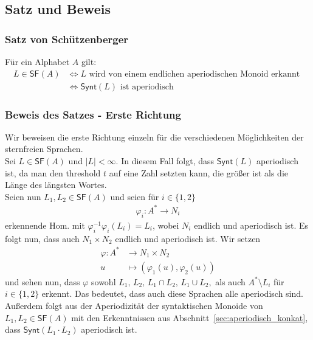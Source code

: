 \documentclass[12pt, german]{article}
\newcommand{\inv}{^{-1}}
\newcommand{\starfree}{\mathsf{SF}}
\newcommand{\synt}{\mathsf{Synt}}
\newcommand{\aast}{A^{\ast}}
\begin{document}
	\subsection{Satz und Beweis}
	\subsubsection{Satz von Schützenberger}
	Für ein Alphabet $A$ gilt: 
	\begin{align*}
		L \in \starfree(A) &\iff L \text{ wird von einem endlichen aperiodischen Monoid erkannt } \\ 
		&\iff \synt(L) \text{ ist aperiodisch }
	\end{align*}
	
	\subsubsection{Beweis des Satzes - Erste Richtung}
	Wir beweisen die erste Richtung einzeln für die verschiedenen Möglichkeiten der sternfreien Sprachen.\\
	
	Sei $L \in \starfree(A)$ und $|L| < \infty$.
	In diesem Fall folgt, dass $\synt(L)$ aperiodisch ist, da man den threshold $t$ auf eine Zahl setzten kann, die grö\ss er ist als die Länge des längsten Wortes.\\
	
	Seien nun $L_1, L_2 \in \starfree(A)$ und seien für $i \in \{1,2\}$
	\begin{align*}
		\varphi_{i} : \aast \to N_i
	\end{align*} erkennende Hom. mit $\varphi_i\inv\varphi_{i}(L_i) = L_i$, wobei $N_i$ endlich und aperiodisch ist.
	Es folgt nun, dass auch $N_1 \times N_2$ endlich und aperiodisch ist. Wir setzen 
	\begin{align*}
		\varphi: \aast &\to N_1 \times N_2 \\
		u &\mapsto (\varphi_1(u), \varphi_2(u))
	\end{align*} 
	und sehen nun, dass $\varphi$ sowohl $L_1, \,L_2,  \, L_1 \cap L_2,   \,L_1 \cup L_2,$ als auch $\aast \setminus L_i$ für $i \in \{1,2\}$ erkennt.
	Das bedeutet, dass auch diese Sprachen alle aperiodisch sind.\\
	
	Au\ss erdem folgt aus der Aperiodizität der syntaktischen Monoide von $L_1, L_2 \in \starfree(A)$ mit den Erkenntnissen aus Abschnitt~\ref{sec:aperiodisch_konkat}, dass $\synt(L_1 \cdot L_2)$ aperiodisch ist. \\
	
\end{document}

